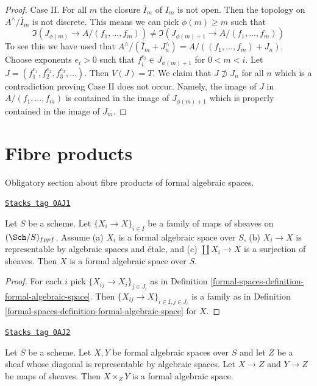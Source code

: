 \begin{proof}
\medskip\noindent
Case II. For all $m$ the closure $\bar I_m$ of $I_m$ is not open.
Then the topology on $A^\wedge/\bar I_m$ is not discrete. This means
we can pick $\phi(m) \geq m$ such that
$$
\Im(J_{\phi(m)} \to A/(f_1, \ldots, f_m)) \not =
\Im(J_{\phi(m) + 1} \to A/(f_1, \ldots, f_m))
$$
To see this we have used that
$A^\wedge/(\bar I_m + J_n^\wedge) = A/((f_1, \ldots, f_m) + J_n)$.
Choose exponents $e_i > 0$ such that $f_i^{e_i} \in J_{\phi(m) + 1}$
for $0 < m < i$. Let $J = (f_1^{e_1}, f_2^{e_2}, f_3^{e_3}, \ldots)$.
Then $V(J) = T$. We claim that $J \not \supset J_n$ for all $n$
which is a contradiction proving Case II does not occur.
Namely, the image of $J$ in $A/(f_1, \ldots, f_m)$ is contained
in the image of $J_{\phi(m) + 1}$ which is properly contained in the
image of $J_m$.
\end{proof}

\section{Fibre products}
\label{formal-spaces-section-fibre-products}
Obligatory section about fibre products of formal algebraic spaces.

\begin{lemma}
\label{formal-spaces-lemma-etale-covering-by-formal-algebraic-spaces}
\href{https://stacks.math.columbia.edu/tag/0AJ1}{\texttt{Stacks tag 0AJ1}}

Let $S$ be a scheme. Let $\{X_i \to X\}_{i \in I}$ be a family of maps
of sheaves on $(\Sch/S)_{fppf}$. Assume (a) $X_i$ is a
formal algebraic space over $S$, (b) $X_i \to X$ is representable
by algebraic spaces and \'etale, and (c) $\coprod X_i \to X$
is a surjection of sheaves. Then $X$ is a formal algebraic space
over $S$.
\end{lemma}

\begin{proof}
For each $i$ pick $\{X_{ij} \to X_i\}_{j \in J_i}$ as in
Definition \ref{formal-spaces-definition-formal-algebraic-space}.
Then $\{X_{ij} \to X\}_{i \in I, j \in J_i}$ is a family
as in Definition \ref{formal-spaces-definition-formal-algebraic-space}
for $X$.
\end{proof}

\begin{lemma}
\label{formal-spaces-lemma-fibre-products-general}
\href{https://stacks.math.columbia.edu/tag/0AJ2}{\texttt{Stacks tag 0AJ2}}

Let $S$ be a scheme. Let $X, Y$ be formal algebraic spaces over $S$
and let $Z$ be a sheaf whose diagonal is representable by
algebraic spaces. Let $X \to Z$ and $Y \to Z$ be maps of sheaves.
Then $X \times_Z Y$ is a formal algebraic space.
\end{lemma}


